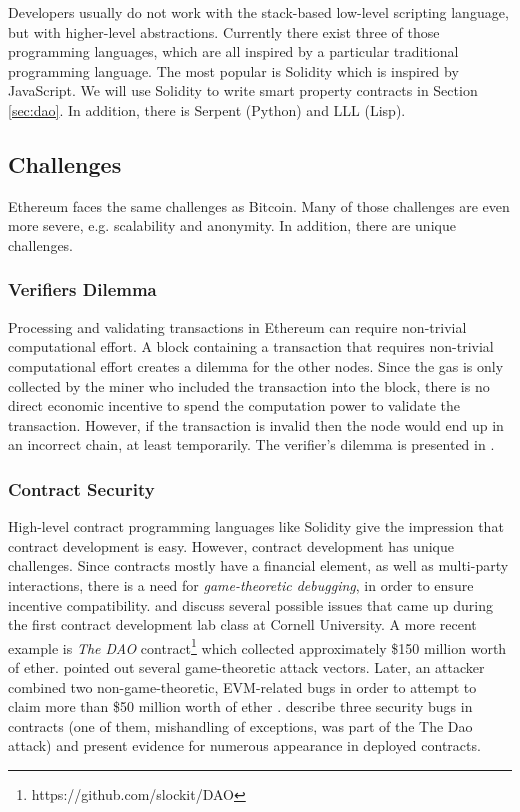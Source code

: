 Developers usually do not work with the stack-based low-level scripting language, but with higher-level abstractions. Currently there exist three of those programming languages, which are all inspired by a particular traditional programming language. The most popular is Solidity which is inspired by JavaScript. We will use Solidity to write smart property contracts in Section \ref{sec:dao}. In addition, there is Serpent (Python) and LLL (Lisp).

\subsection{Challenges}

Ethereum faces the same challenges as Bitcoin. Many of those challenges are even more severe, e.g. scalability and anonymity. In addition, there are unique challenges.

\subsubsection{Verifiers Dilemma}
Processing and validating transactions in Ethereum can require non-trivial computational effort.
A block containing a transaction that requires non-trivial computational effort creates a dilemma for the other nodes. Since the gas is only collected by the miner who included the transaction into the block, there is no direct economic incentive to spend the computation power to validate the transaction. However, if the transaction is invalid then the node would end up in an incorrect chain, at least temporarily.
The verifier's dilemma is presented in \parencite{Luu:2015:DIC:2810103.2813659}.

\subsubsection{Contract Security}

High-level contract programming languages like Solidity give the impression that contract development is easy. However, contract development has unique challenges. Since contracts mostly have a financial element, as well as multi-party interactions, there is a need for \emph{game-theoretic debugging}, in order to ensure incentive compatibility. \cite{delmolino2015programmer} and \cite{delmolino2015step} discuss several possible issues that came up during the first contract development lab class at Cornell University. A more recent example is \emph{The DAO} contract\footnote{https://github.com/slockit/DAO} which collected approximately \$150 million worth of ether. \cite{mark2016} pointed out several game-theoretic attack vectors. Later, an attacker combined two non-game-theoretic, EVM-related bugs in order to attempt to claim more than \$50 million worth of ether \parencite{daian2016dao}. \cite{cryptoeprint:2016:633} describe three security bugs in contracts (one of them, mishandling of exceptions, was part of the The Dao attack) and present evidence for numerous appearance in deployed contracts.


